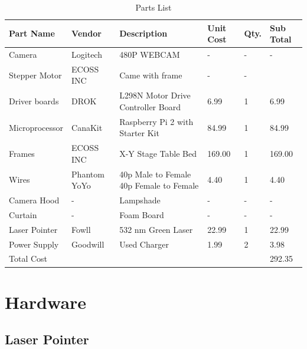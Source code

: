 \documentclass[letterpaper,12pt,oneside]{book}
\begin{document}
		\begin{table}[ht!]
			\begin{center}	
				\caption{Parts List}
				\begin{tabular}{|l|p{1.5cm}|p{4cm}|l|l|l|}
					\hline
					Part Name & Vendor & Description  & Unit Cost & Qty. & Sub Total \\ \hline
					Camera & Logitech & 480P WEBCAM & - & - & -\\ 
					\hline
					Stepper Motor & ECOSS INC & Came with frame & - & - &\\ 
					\hline
					Driver boards & DROK & L298N Motor Drive Controller Board & 6.99 & 1 & 6.99\\
					\hline
					Microprocessor & CanaKit & Raspberry Pi 2 with Starter Kit & 84.99 & 1 & 84.99\\
					\hline
					Frames & ECOSS INC & X-Y Stage Table Bed &  169.00 & 1 & 169.00\\
					\hline
					Wires & Phantom YoYo & 40p Male to Female 40p Female to Female & 4.40 & 1 & 4.40\\
					\hline
					Camera Hood & - & Lampshade & - & - & -\\
					\hline
					Curtain & - & Foam Board & - & - & -\\
					\hline
					Laser Pointer & Fowll & 532 nm Green Laser & 22.99 & 1 & 22.99\\
					\hline
					Power Supply & Goodwill & Used Charger & 1.99 & 2 & 3.98\\
					\hline
					Total Cost & & & & & 292.35\\
					\hline
				\end{tabular}
			\end{center}
		\end{table}
		
		
		\section{Hardware}
		
		\subsection{Laser Pointer}
		
\end{document}
